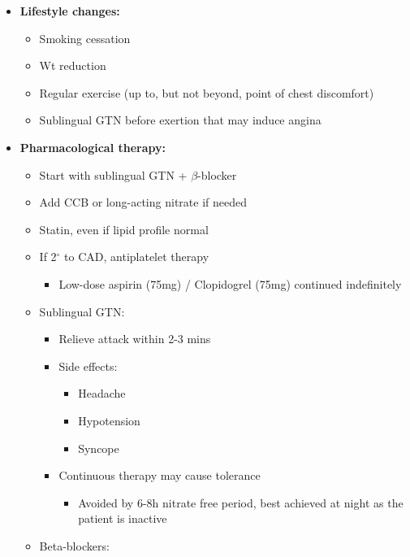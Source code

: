 \documentclass[
  12pt,
]{memoir}
\providecommand{\tightlist}{%
  \setlength{\itemsep}{0pt}\setlength{\parskip}{0pt}}
\begin{document}
\begin{itemize}
\tightlist
\item
  \textbf{Lifestyle changes:} \label{item:life}

  \begin{itemize}
  \tightlist
  \item
    Smoking cessation
  \item
    Wt reduction
  \item
    Regular exercise (up to, but not beyond, point of chest discomfort)
  \item
    Sublingual GTN before exertion that may induce angina
  \end{itemize}
\item
  \textbf{Pharmacological therapy:}

  \begin{itemize}
  \tightlist
  \item
    Start with sublingual GTN + \(\beta\)-blocker
  \item
    Add CCB or long-acting nitrate if needed
  \item
    Statin, even if lipid profile normal
  \item
    If 2\(^\circ\) to CAD, antiplatelet therapy

    \begin{itemize}
    \tightlist
    \item
      Low-dose aspirin (75mg) / Clopidogrel (75mg) continued
      indefinitely
    \end{itemize}
  \item
    Sublingual GTN:

    \begin{itemize}
    \tightlist
    \item
      Relieve attack within 2-3 mins
    \item
      Side effects:

      \begin{itemize}
      \tightlist
      \item
        Headache
      \item
        Hypotension
      \item
        Syncope
      \end{itemize}
    \item
      Continuous therapy may cause tolerance

      \begin{itemize}
      \tightlist
      \item
        Avoided by 6-8h nitrate free period, best achieved at night as
        the patient is inactive
      \end{itemize}
    \end{itemize}
  \item
    Beta-blockers:


\end{itemize}
\end{itemize}
\end{document}
